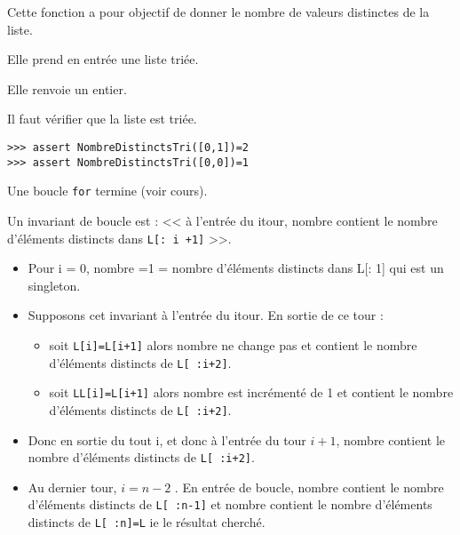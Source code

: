 \ifprof
\begin{corrige}
Cette fonction a pour objectif de donner le nombre de valeurs distinctes de la liste. 

Elle prend en entrée une liste triée. 

Elle renvoie un entier.
\end{corrige}
\else
\fi
{}
\ifprof
\begin{corrige}
Il faut vérifier que la liste est triée.
\end{corrige}
\else
\fi
{}
\ifprof
\begin{corrige}
\begin{lstlisting}
>>> assert NombreDistinctsTri([0,1])=2
>>> assert NombreDistinctsTri([0,0])=1
\end{lstlisting}
\end{corrige}
\else
\fi
{}
\ifprof
\begin{corrige}
Une boucle \lstinline{for} termine (voir cours).
\end{corrige}
\else
\fi

\ifprof
\begin{corrige}
Un invariant de boucle est :  << à l’entrée du i\ieme tour, nombre contient le nombre d’éléments distincts dans \texttt{L[: i +1]} >>.
\begin{itemize}
\item Pour i = 0, nombre =1 = nombre d’éléments distincts dans L[: 1] qui est un singleton.
\item Supposons cet invariant à l’entrée du i\ieme tour. En sortie de ce tour :
\begin{itemize}
\item soit \texttt{L[i]=L[i+1]} alors nombre ne change pas et contient le nombre d’éléments distincts de \texttt{L[ :i+2]}.
\item soit \texttt{LL[i]=L[i+1]} alors nombre est incrémenté de 1 et contient le nombre d’éléments distincts de \texttt{L[ :i+2]}.
\end{itemize}
\item Donc en sortie du tout i, et donc à l’entrée du tour $i +1$, nombre contient le nombre d’éléments distincts de \texttt{L[ :i+2]}.
\item Au dernier tour, $i = n - 2$ . En entrée de boucle, nombre contient le nombre d’éléments distincts de \texttt{L[ :n-1]} et
nombre contient le nombre d’éléments distincts de \texttt{L[ :n]=L} ie le résultat cherché.
\end{itemize}
\end{corrige}
\else
\fi

